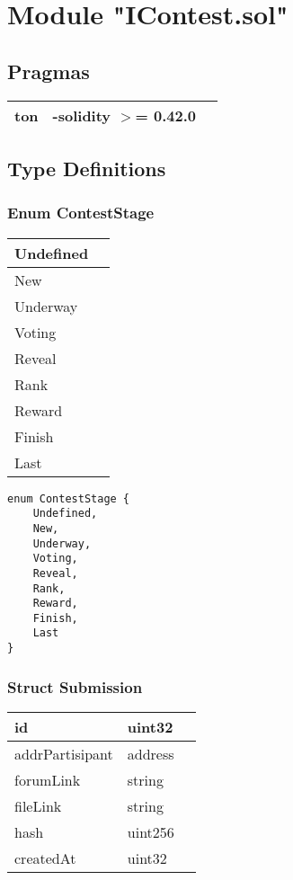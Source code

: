 
\section{Module "IContest.sol"}


\subsection{Pragmas}


\noindent\begin{tabular}{|l|l|p{5cm}|}\hline
ton & -solidity $>$= 0.42.0 &\\\hline
\end{tabular}


\subsection{Type Definitions}


\subsubsection{Enum ContestStage}


\ifsoltables
\noindent\begin{tabular}{|l|p{6cm}|}\hline
Undefined & \\\hline
New & \\\hline
Underway & \\\hline
Voting & \\\hline
Reveal & \\\hline
Rank & \\\hline
Reward & \\\hline
Finish & \\\hline
Last & \\\hline
\end{tabular}
\fi


\begin{lstlisting}[firstnumber=3]
enum ContestStage {
    Undefined,
    New,
    Underway,
    Voting,
    Reveal,
    Rank,
    Reward,
    Finish,
    Last
}
\end{lstlisting}

\subsubsection{Struct Submission}


\ifsoltables
\noindent\begin{tabular}{|l|l|p{6cm}|}\hline
id & uint32 & \\\hline
addrPartisipant & address & \\\hline
forumLink & string & \\\hline
fileLink & string & \\\hline
hash & uint256 & \\\hline
createdAt & uint32 & \\\hline
\end{tabular}
\fi


